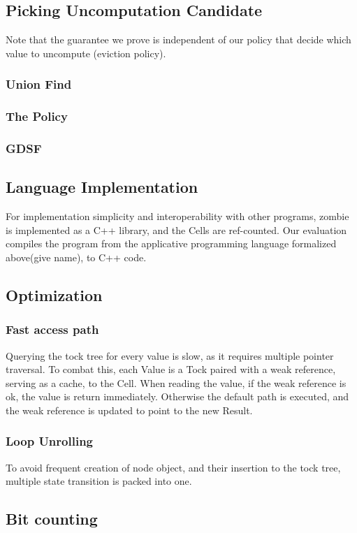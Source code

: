 \documentclass[acmsmall]{acmart}
\begin{document}
	\subsection{Picking Uncomputation Candidate}
	Note that the guarantee we prove is independent of our policy that decide which value to uncompute (eviction policy).
	\subsubsection{Union Find}
	\subsubsection{The Policy}
	\subsubsection{GDSF}
	\subsection{Language Implementation}
	For implementation simplicity and interoperability with other programs, zombie is implemented as a C++ library, and the Cells are ref-counted. Our evaluation compiles the program from the applicative programming language formalized above(give name), to C++ code.
	\subsection{Optimization}
	\subsubsection{Fast access path}
	Querying the tock tree for every value is slow, as it requires multiple pointer traversal.
	To combat this, each Value is a Tock paired with a weak reference, serving as a cache, to the Cell. When reading the value, if the weak reference is ok, the value is return immediately. Otherwise the default path is executed, and the weak reference is updated to point to the new Result.
	\subsubsection{Loop Unrolling}
	To avoid frequent creation of node object, and their insertion to the tock tree, multiple state transition is packed into one.
	\subsection{Bit counting}
\end{document}

